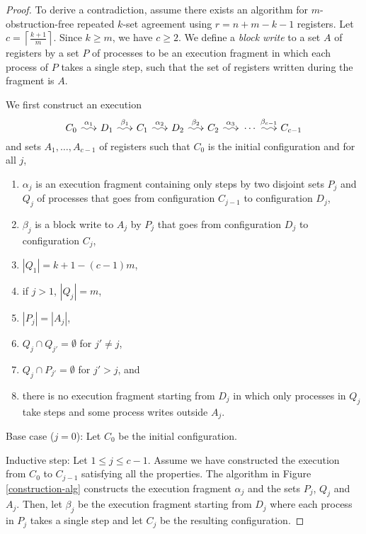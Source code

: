 \documentclass[11pt]{article}
\makeatletter
\newcommand{\ceil}[1]{\left\lceil #1 \right\rceil}
\newcommand{\longsquiggly}{\xymatrix@C=1.5em{{}\ar@{~>}[r]&{}}}
\newcommand{\goes}[1]{\!\overset{#1}{\longsquiggly}\!}
\makeatother
\begin{document}
\begin{proof}
To derive a contradiction, assume there exists an algorithm for $m$-obstruction-free repeated $k$-set agreement using $r=n+m-k-1$ registers.
Let $c=\ceil{\frac{k+1}{m}}$.  Since $k\geq m$, we have $c\geq 2$.
We define a {\it block write} to a set $A$ of registers by a set $P$ of processes
to be an execution fragment in which each process of $P$ takes a single step,
such that the set of registers written during the fragment is $A$.

We first construct
an execution
\begin{equation}
\label{execution}
C_0 \goes{\alpha_1} D_1 \goes{\beta_1} C_1 \goes{\alpha_2} D_2 \goes{\beta_2} C_2 \goes{\alpha_3} \cdots \goes{\beta_{c-1}} C_{c-1}
\end{equation}
and sets $A_1,\ldots,A_{c-1}$
of registers such that $C_0$ is the initial configuration and for all $j$,
\begin{enumerate}
\item
\label{alphaCD}
$\alpha_j$ is an execution fragment containing only steps by two disjoint sets $P_j$ and $Q_j$ of processes that goes from configuration $C_{j-1}$ to configuration $D_j$,
\item
\label{betaDC}
$\beta_j$ is a block write to $A_j$ by $P_j$ that goes from configuration $D_j$ to configuration $C_j$,
\item
\label{Q1size}
$|Q_1| = k+1-(c-1)m$,
\item
\label{Qjsize}
if $j>1$, $|Q_j|=m$,
\item
\label{PAsize}
$|P_j|=|A_j|$,
\item
\label{Qdisjoint}
$Q_j \cap Q_{j'} =\emptyset$ for $j'\neq j$,
\item
\label{PQdisjoint}
$Q_j\cap P_{j'} =\emptyset$ for $j'>j$, and
\item
\label{no-continuation}
there is 
no execution fragment starting from $D_j$ in which only processes in $Q_j$ take steps and some process writes outside $A_j$.
\end{enumerate}


{\sc Base case} ($j=0$):  Let $C_0$ be the initial configuration.

\smallskip

{\sc Inductive step}:  Let $1\leq j\leq c-1$.  Assume we have constructed the execution from $C_0$ to $C_{j-1}$ satisfying all the properties.
The algorithm in Figure \ref{construction-alg} constructs the execution fragment $\alpha_j$
and the sets $P_j$, $Q_j$ and $A_j$.
Then, let $\beta_j$  be the execution fragment starting from $D_j$ where each process in $P_j$ takes a single step and let $C_j$ be the resulting configuration.


\end{proof}
\end{document}
